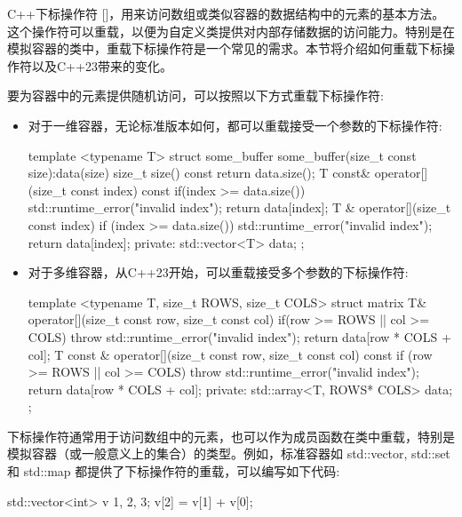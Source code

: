 
C++下标操作符 []，用来访问数组或类似容器的数据结构中的元素的基本方法。这个操作符可以重载，以便为自定义类提供对内部存储数据的访问能力。特别是在模拟容器的类中，重载下标操作符是一个常见的需求。本节将介绍如何重载下标操作符以及C++23带来的变化。


要为容器中的元素提供随机访问，可以按照以下方式重载下标操作符:

\begin{itemize}
\item
对于一维容器，无论标准版本如何，都可以重载接受一个参数的下标操作符:

\begin{cpp}
template <typename T>
struct some_buffer
{
    some_buffer(size_t const size):data(size)
    {}
    size_t size() const { return data.size(); }
    T const& operator[](size_t const index) const
    {
        if(index >= data.size())
        std::runtime_error("invalid index");
        return data[index];
    }
    T & operator[](size_t const index)
    {
        if (index >= data.size())
        std::runtime_error("invalid index");
        return data[index];
    }
private:
    std::vector<T> data;
};
\end{cpp}

\item
对于多维容器，从C++23开始，可以重载接受多个参数的下标操作符:

\begin{cpp}
template <typename T, size_t ROWS, size_t COLS>
struct matrix
{
    T& operator[](size_t const row, size_t const col)
    {
        if(row >= ROWS || col >= COLS)
        throw std::runtime_error("invalid index");
        return data[row * COLS + col];
    }
    T const & operator[](size_t const row, size_t const col) const
    {
        if (row >= ROWS || col >= COLS)
        throw std::runtime_error("invalid index");
        return data[row * COLS + col];
    }
private:
    std::array<T, ROWS* COLS> data;
};
\end{cpp}
\end{itemize}


下标操作符通常用于访问数组中的元素，也可以作为成员函数在类中重载，特别是模拟容器（或一般意义上的集合）的类型。例如，标准容器如 std::vector, std::set 和 std::map 都提供了下标操作符的重载，可以编写如下代码:

\begin{cpp}
std::vector<int> v {1, 2, 3};
v[2] = v[1] + v[0];
\end{cpp}

